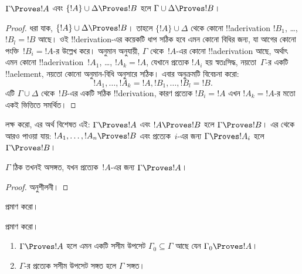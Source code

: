 \documentclass[../../../include/open-logic-section]{subfiles}
\begin{document}
\begin{prop}[পরিযায়িতা]
$\Gamma \Proves !A$ এবং $\{!A\} \cup \Delta \Proves
!B$ হলে $\Gamma \cup \Delta \Proves !B$।
\end{prop}

\begin{proof}
  ধরা যাক, $\{!A\} \cup \Delta \Proves !B$। তাহলে $\{!A\} \cup
  \Delta$ থেকে কোনো !!a{derivation} $!B_1$, \dots, $!B_l = !B$ আছে।
  ওই !!{derivation}-এর কয়েকটি ধাপ সঠিক হবে এমন কোনো বিধির জন্য, যা
  আগের কোনো পংক্তি~$!B_i = !A$-র উল্লেখ করে। অনুমান অনুযায়ী,
  $\Gamma$ থেকে~$!A$-এর কোনো !!a{derivation} আছে, অর্থাৎ এমন কোনো
  !!a{derivation}~$!A_1$, \dots, $!A_k = !A$, যেখানে প্রত্যেক $!A_i$
  হয় স্বতঃসিদ্ধ, নয়তো~$\Gamma$-র একটি !!a{element}, নয়তো কোনো
  অনুমান-বিধি অনুসারে সঠিক। এবার অনুক্রমটি বিবেচনা করো:
  \[
  !A_1, \dots, !A_k = !A, !B_1, \dots, !B_l = !B.
  \]
  এটি $\Gamma \cup \Delta$ থেকে~$!B$-এর একটি সঠিক !!{derivation},
  কারণ প্রত্যেক $!B_i = !A$ এখন $!A_k = !A$-র মতো একই ভিত্তিতে
  সমর্থিত।
\end{proof}

লক্ষ করো, এর অর্থ বিশেষত এই: $\Gamma \Proves !A$ এবং $!A \Proves
!B$ হলে $\Gamma \Proves !B$। এর থেকে আরও পাওয়া যায়: $!A_1,
\dots, !A_n \Proves !B$ এবং প্রত্যেক~$i$-এর জন্য $\Gamma \Proves
!A_i$ হলে $\Gamma \Proves !B$।

\begin{prop}
$\Gamma$ ঠিক তখনই অসঙ্গত, যখন প্রত্যেক~$!A$-এর জন্য $\Gamma \Proves !A$।
\end{prop}

\begin{proof}
অনুশীলনী।
\end{proof}

\begin{prob}
 প্রমাণ করো।
\end{prob}
\tagendprob

\begin{prob}
 প্রমাণ করো।
\end{prob}
\tagendprob

\begin{prop}[সংহতি]
  \begin{enumerate}
  \item $\Gamma \Proves !A$ হলে এমন একটি সসীম উপসেট $\Gamma_0
    \subseteq \Gamma$ আছে যেন $\Gamma_0 \Proves !A$।
  \item $\Gamma$-র প্রত্যেক সসীম উপসেট সঙ্গত হলে $\Gamma$ সঙ্গত।
  \end{enumerate}
\end{prop}
\end{document}
